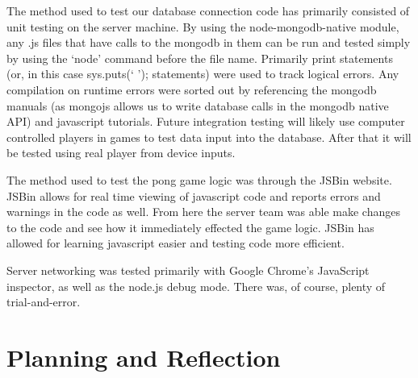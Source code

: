 \documentclass[letterpaper,12pt]{article}
\begin{document}
The method used to test our database connection code has primarily consisted of unit testing on the server machine. By using the node-mongodb-native module, any .js files that have calls to the mongodb in them can be run and tested simply by using the ‘node’ command before the file name. Primarily print statements (or, in this case sys.puts(‘ ’); statements) were used to track logical errors. Any compilation on runtime errors were sorted out by referencing the mongodb manuals (as mongojs allows us to write database calls in the mongodb native API) and javascript tutorials. Future integration testing will likely use computer controlled players in games to test data input into the database. After that it will be tested using real player from device inputs.

The method used to test the pong game logic was through the JSBin website. JSBin allows for real time viewing of javascript code and reports errors and warnings in the code as well. From here the server team was able make changes to the code and see how it immediately effected the game logic. JSBin has allowed for learning javascript easier and testing code more efficient.

Server networking was tested primarily with Google Chrome’s JavaScript inspector, as well as the node.js debug mode. There was, of course, plenty of trial-and-error.

\section{Planning and Reflection}
\end{document}

